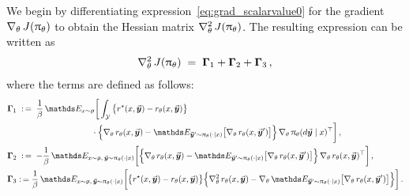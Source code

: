 	We begin by differentiating expression~\eqref{eq:grad_scalarvalue0} for the gradient $\nabla_{\theta} \,  J(\uppi_{\theta})$ to obtain the Hessian matrix $\nabla_{\theta}^2 \,  J(\uppi_{\theta})$. The resulting expression can be written as
	\begin{align*}
		\nabla_{\theta}^2 \,  J(\uppi_{\theta})
		\; = \; \boldsymbol{\Gamma}_1 + \boldsymbol{\Gamma}_2 + \boldsymbol{\Gamma}_3 \, ,
	\end{align*}
	where the terms are defined as follows:
	\begin{align*}
		\GammaMt_1
		& \; \defn \; \frac{1}{\parabeta} \, \Exp_{\prompt \sim \promptdistr}
		\bigg[ \int_{\ResponseSp} \big\{ \rewardstar(\prompt, \response) - \rewardtheta(\prompt, \response) \big\} \\
		& \qquad \qquad \qquad \qquad \quad
        \cdot \Big\{ \gradtheta \rewardtheta(\prompt, \response) - \Exp_{\responsenew \sim \policytheta(\cdot \mid \prompt)}\big[ \gradtheta \rewardtheta(\prompt, \responsenew) \big] \Big\} \, \gradtheta \policytheta(\diff \response \mid \prompt)^{\top} \bigg] \, ,  \\
		\GammaMt_2
		& \; \defn \; - \frac{1}{\parabeta} \, \Exp_{\prompt \sim \promptdistr, \,  \response \sim \policytheta(\cdot \mid \prompt)}
		\bigg[ \Big\{ \gradtheta \rewardtheta(\prompt, \response) - \Exp_{\responsenew \sim \policytheta(\cdot \mid \prompt)}\big[ \gradtheta \rewardtheta(\prompt, \responsenew) \big] \Big\} \, \gradtheta \rewardtheta(\prompt, \response)^{\top} \bigg] \, ,  \\
		\GammaMt_3
		& \defn \frac{1}{\parabeta} \, \Exp_{\prompt \sim \promptdistr, \,  \response \sim \policytheta(\cdot \mid \prompt)}
		\bigg[ \big\{ \rewardstar(\prompt, \response) - \rewardtheta(\prompt, \response) \big\} \Big\{ \hesstheta \rewardtheta(\prompt, \response) - \gradtheta \Exp_{\responsenew \sim \policytheta(\cdot \mid \prompt)}\big[ \gradtheta \rewardtheta(\prompt, \responsenew) \big] \Big\} \bigg] \, .
	\end{align*}
	
